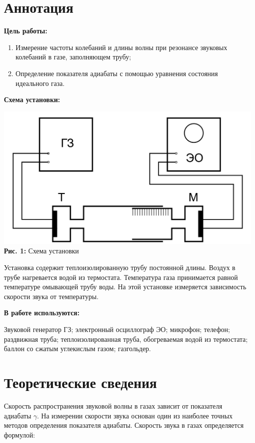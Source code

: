 \documentclass[12pt,a4paper]{scrartcl}
\begin{document}
	\section{Аннотация}
	
	\textbf{Цель работы: }
	
	\begin{enumerate}
		\item Измерение частоты колебаний и длины волны при
		резонансе звуковых колебаний в газе, заполняющем трубу;
		\item Определение показателя адиабаты с помощью уравнения состояния идеального газа.
	\end{enumerate}
	
	\textbf{Схема установки:}
	\begin{center}
		\includegraphics[scale=0.25]{PIC_1.png}
		\\\textbf{Рис. 1:} Схема установки
	\end{center}
		
	Установка содержит теплоизолированную трубу постоянной длины. Воздух в трубе нагревается водой из термостата. Температура газа принимается равной температуре омывающей трубу воды. На этой установке измеряется зависимость скорости звука от температуры.	
		
	\textbf{В работе используются:}
	
	Звуковой генератор ГЗ; электронный осциллограф ЭО; микрофон; телефон; раздвижная труба; теплоизолированная труба, обогреваемая водой из термостата; баллон со сжатым углекислым газом; газгольдер.
	
	\section{Теоретические сведения}
	Скорость распространения звуковой волны в газах зависит от показателя адиабаты $\gamma$. На измерении скорости звука основан один из наиболее точных методов определения показателя адиабаты. Скорость звука в газах определяется формулой:
	
\end{document}
